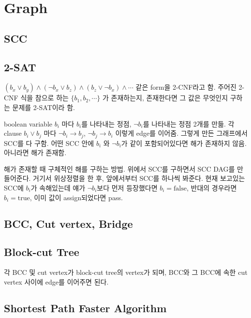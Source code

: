 \documentclass[10pt,landscape,a4paper,twocolumn]{article}
\begin{document}
\section{Graph}

\subsection{SCC}


\subsection{2-SAT}

$(b_{x} \lor b_{y}) \land (\neg b_{x} \lor b_{z}) \land (b_{z} \lor \neg b_{x}) \land \cdots$ 같은 form을 2-CNF라고 함. 주어진 2-CNF 식을 참으로 하는 $\{ b_1, b_2, \cdots \}$ 가 존재하는지, 존재한다면 그 값은 무엇인지 구하는 문제를 2-SAT이라 함.

boolean variable $b_{i}$ 마다 $b_{i}$를 나타내는 정점, $\neg b_{i} $를 나타내는 정점 2개를 만듦. 각 clause $b_{i} \lor b_{j}$ 마다 $\neg b_{i} \to b_{j}$, $\neg b_{j} \to b_{i}$ 이렇게 edge를 이어줌. 그렇게 만든 그래프에서 SCC를 다 구함. 어떤 SCC 안에 $b_{i}$ 와 $\neg b_{i}$가 같이 포함되어있다면 해가 존재하지 않음. 아니라면 해가 존재함.

해가 존재할 때 구체적인 해를 구하는 방법. 위에서 SCC를 구하면서 SCC DAG를 만들어준다. 거기서 위상정렬을 한 후, 앞에서부터 SCC를 하나씩 봐준다. 현재 보고있는 SCC에 $b_{i}$가 속해있는데 얘가 $\neg b_{i}$보다 먼저 등장했다면 $b_{i} = \mathrm{false}$, 반대의 경우라면 $b_{i} = \mathrm{true}$, 이미 값이 assign되었다면 pass.

\subsection{BCC, Cut vertex, Bridge}


\subsection{Block-cut Tree}

각 BCC 및 cut vertex가 block-cut tree의 vertex가 되며, BCC와 그 BCC에 속한 cut vertex 사이에 edge를 이어주면 된다.

\subsection{Shortest Path Faster Algorithm}

\end{document}
